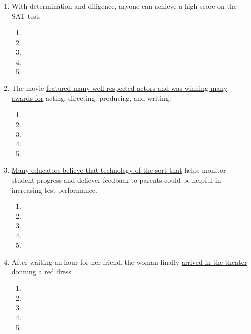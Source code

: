 \begin{enumerate}
\bigskip
\item With determination and diligence, anyone can achieve a high score on the SAT test. 

\bigskip
\begin{enumerate}[label=(\Alph*)]
\item\hrulefill
\item\hrulefill
\item\hrulefill
\item\hrulefill
\item\hrulefill
\end{enumerate}

\bigskip
\item The movie \ul{featured many well-respected actors and was winning many awards for} acting, directing, producing, and writing. 

\bigskip
\begin{enumerate}[label=(\Alph*)]
\item\hrulefill
\item\hrulefill
\item\hrulefill
\item\hrulefill
\item\hrulefill
\end{enumerate}

\bigskip
\item \ul{Many educators believe that technology of the sort that} helps monitor student progress and deliever feedback to parents could be helpful in increasing test performance. 

\bigskip
\begin{enumerate}[label=(\Alph*)]
\item\hrulefill
\item\hrulefill
\item\hrulefill
\item\hrulefill
\item\hrulefill
\end{enumerate}

\bigskip
\item After waiting an hour for her friend, the woman finally \ul{arrived in the theater donning a red dress.}

\bigskip
\begin{enumerate}[label=(\Alph*)]
\item\hrulefill
\item\hrulefill
\item\hrulefill
\item\hrulefill
\item\hrulefill
\end{enumerate}


\end{enumerate}
